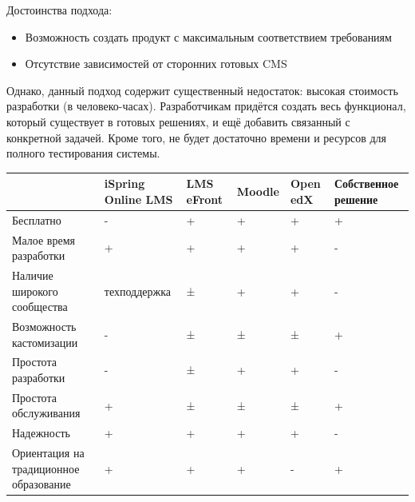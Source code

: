 \documentclass[a4paper,14pt]{article}
\begin{document}
Достоинства подхода:

\begin{itemize}
	\item Возможность создать продукт с максимальным соответствием требованиям
	\item Отсутствие зависимостей от сторонних готовых CMS 
\end{itemize}

Однако, данный подход содержит существенный недостаток: высокая стоимость разработки (в человеко-часах).
Разработчикам придётся создать весь функционал, который существует в готовых решениях,  и ещё добавить связанный с конкретной задачей.
Кроме того, не будет достаточно времени и ресурсов для полного тестирования системы.




\begin{landscape}
	\begin{table}[!h]
		\begin{center}
			\begin{flushleft}
			\end{flushleft}
			
			\begin{tabular}{|l|l|l|l|l|l|}
				\hline
				& iSpring Online LMS & LMS eFront & Moodle & Open edX & Собственное решение \\ \hline
				Бесплатно                              & -                  & +          & +      & +        & +                   \\ \hline
				Малое время разработки                 & +                  & +          & +      & +        & -                   \\ \hline
				Наличие широкого сообщества            & техподдержка       & ±          & +      & +        & -                   \\ \hline
				Возможность кастомизации               & -                  & ±          & ±      & ±        & +                   \\ \hline
				Простота разработки                    & -                  & ±          & +      & +        & -                   \\ \hline
				Простота обслуживания                  & +                  & ±          & ±      & ±        & +                   \\ \hline
				Надежность                             & +                  & +          & +      & +        & -                   \\ \hline
				Ориентация на традиционное образование & +                  & +          & +      & -        & +                   \\ \hline
			\end{tabular}
		\end{center}
	\end{table}
\end{landscape}
\end{document}
